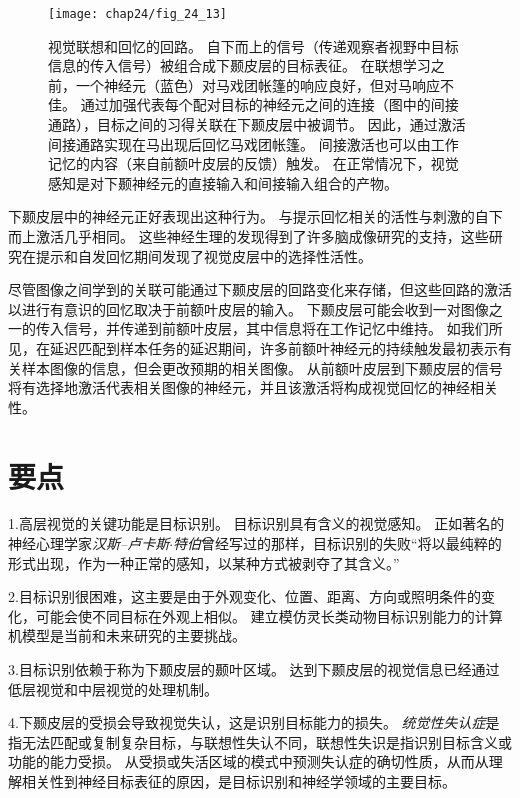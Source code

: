 \begin{figure}[htbp]
	\centering
	\texttt{[image: chap24/fig\_24\_13]}
	\caption{视觉联想和回忆的回路。
		自下而上的信号（传递观察者视野中目标信息的传入信号）被组合成下颞皮层的目标表征。
		在联想学习之前，一个神经元（蓝色）对马戏团帐篷的响应良好，但对马响应不佳。
		通过加强代表每个配对目标的神经元之间的连接（图中的间接通路），目标之间的习得关联在下颞皮层中被调节。
		因此，通过激活间接通路实现在马出现后回忆马戏团帐篷。
		间接激活也可以由工作记忆的内容（来自前额叶皮层的反馈）触发。
		在正常情况下，视觉感知是对下颞神经元的直接输入和间接输入组合的产物。}
	\label{fig:24_13}
\end{figure}


下颞皮层中的神经元正好表现出这种行为。
与提示回忆相关的活性与刺激的自下而上激活几乎相同。
这些神经生理的发现得到了许多脑成像研究的支持，这些研究在提示和自发回忆期间发现了视觉皮层中的选择性活性。


尽管图像之间学到的关联可能通过下颞皮层的回路变化来存储，但这些回路的激活以进行有意识的回忆取决于前额叶皮层的输入。
下颞皮层可能会收到一对图像之一的传入信号，并传递到前额叶皮层，其中信息将在工作记忆中维持。
如我们所见，在延迟匹配到样本任务的延迟期间，许多前额叶神经元的持续触发最初表示有关样本图像的信息，但会更改预期的相关图像。
从前额叶皮层到下颞皮层的信号将有选择地激活代表相关图像的神经元，并且该激活将构成视觉回忆的神经相关性。



\section{要点}

1.高层视觉的关键功能是目标识别。
目标识别具有含义的视觉感知。
正如著名的神经心理学家\textit{汉斯–卢卡斯$\cdot$特伯}曾经写过的那样，目标识别的失败“将以最纯粹的形式出现，作为一种正常的感知，以某种方式被剥夺了其含义。” 


2.目标识别很困难，这主要是由于外观变化、位置、距离、方向或照明条件的变化，可能会使不同目标在外观上相似。
建立模仿灵长类动物目标识别能力的计算机模型是当前和未来研究的主要挑战。


3.目标识别依赖于称为下颞皮层的颞叶区域。
达到下颞皮层的视觉信息已经通过低层视觉和中层视觉的处理机制。


4.下颞皮层的受损会导致视觉失认，这是识别目标能力的损失。
\textit{统觉性失认症}是指无法匹配或复制复杂目标，与联想性失认不同，联想性失识是指识别目标含义或功能的能力受损。
从受损或失活区域的模式中预测失认症的确切性质，从而从理解相关性到神经目标表征的原因，是目标识别和神经学领域的主要目标。 


